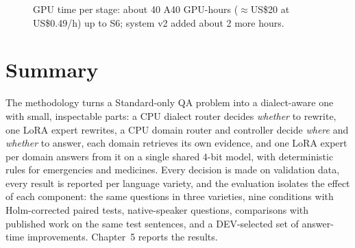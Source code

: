 \begin{figure}[!t]
\centering
{}
\caption{GPU time per stage: about 40 A40 GPU-hours ($\approx$US\$20 at US\$0.49/h) up to S6; system v2 added about 2 more hours.}
\label{fig:gpu}
\end{figure}

\section{Summary}
The methodology turns a Standard-only QA problem into a dialect-aware one with small, inspectable parts: a CPU dialect router decides \emph{whether} to rewrite, one LoRA expert rewrites, a CPU domain router and controller decide \emph{where} and \emph{whether} to answer, each domain retrieves its own evidence, and one LoRA expert per domain answers from it on a single shared 4-bit model, with deterministic rules for emergencies and medicines. Every decision is made on validation data, every result is reported per language variety, and the evaluation isolates the effect of each component: the same questions in three varieties, nine conditions with Holm-corrected paired tests, native-speaker questions, comparisons with published work on the same test sentences, and a DEV-selected set of answer-time improvements. Chapter~5 reports the results.


